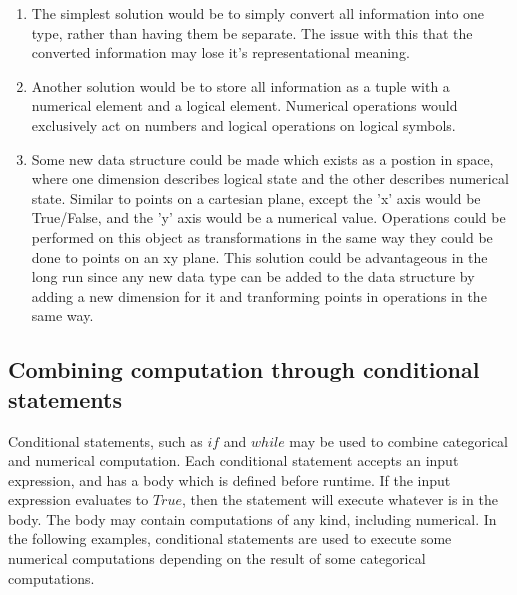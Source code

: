 \documentclass{article}
\begin{document}
	\begin{enumerate}
		
		\item The simplest solution would be to simply convert all information into one type, rather than having them be separate. The issue with this that the converted information may lose it's representational meaning.
		
		\item Another solution would be to store all information as a tuple with a numerical element and a logical element. Numerical operations would exclusively act on numbers and logical operations on logical symbols.
		
		\item Some new data structure could be made which exists as a postion in space, where one dimension describes logical state and the other describes numerical state. Similar to points on a cartesian plane, except the 'x' axis would be True/False, and the 'y' axis would be a numerical value. Operations could be performed on this object as transformations in the same way they could be done to points on an xy plane. This solution could be advantageous in the long run since any new data type can be added to the data structure by adding a new dimension for it and tranforming points in operations in the same way.
		
	\end{enumerate}
	
	
	\subsection{Combining computation through conditional statements}
	
	Conditional statements, such as $if$ and $while$ may be used to combine categorical and numerical computation. Each conditional statement accepts an input expression, and has a body which is defined before runtime. If the input expression evaluates to $True$, then the statement will execute whatever is in the body. The body may contain computations of any kind, including numerical. In the following examples, conditional statements are used to execute some numerical computations depending on the result of some categorical computations.
	
	\newpage	
	
\end{document}
